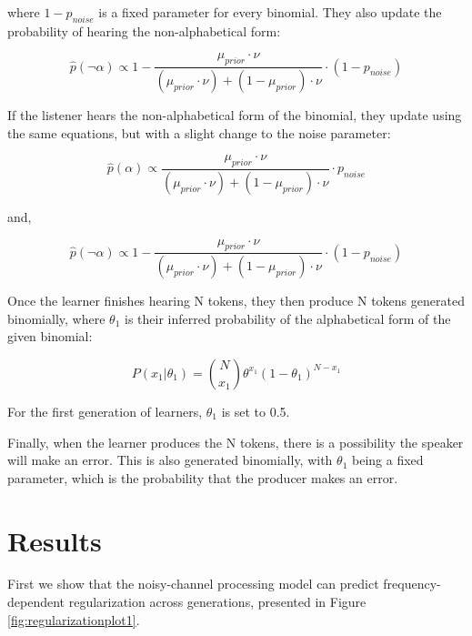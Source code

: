 \documentclass[
  jou,floatsintext]{apa6}
\begin{document}
where \(1 - p_{noise}\) is a fixed parameter for every binomial. They also update the probability of hearing the non-alphabetical form:

\begin{equation}
\label{eq:phatNonalpha}
\hat{p}(\neg\alpha) \propto 1 - \frac{\mu_{prior} \cdot \nu}{(\mu_{prior} \cdot \nu) + (1 - \mu_{prior}) \cdot \nu} \cdot (1-p_{noise})
\end{equation}

If the listener hears the non-alphabetical form of the binomial, they update using the same equations, but with a slight change to the noise parameter:

\begin{equation}
\label{eq:phatAlpha2}
\hat{p}(\alpha) \propto \frac{\mu_{prior} \cdot \nu}{(\mu_{prior} \cdot \nu) + (1 - \mu_{prior}) \cdot \nu} \cdot p_{noise} 
\end{equation}

and,

\begin{equation}
\label{eq:phatNonalpha2}
\hat{p}(\neg\alpha) \propto 1 - \frac{\mu_{prior} \cdot \nu}{(\mu_{prior} \cdot \nu) + (1 - \mu_{prior}) \cdot \nu} \cdot (1-p_{noise}) 
\end{equation}

Once the learner finishes hearing N tokens, they then produce N tokens generated binomially, where \(\theta_1\) is their inferred probability of the alphabetical form of the given binomial:

\begin{equation}
\label{eq:binomialProd}
P(x_1|\theta_1) = \binom{N}{x_1} \theta^{x_1} (1-\theta_1)^{N-x_1}
\end{equation}

For the first generation of learners, \(\theta_1\) is set to 0.5.

Finally, when the learner produces the N tokens, there is a possibility the speaker will make an error. This is also generated binomially, with \(\theta_1\) being a fixed parameter, which is the probability that the producer makes an error.

\section{Results}\label{results}

First we show that the noisy-channel processing model can predict frequency-dependent regularization across generations, presented in Figure \ref{fig:regularizationplot1}.
\end{document}
